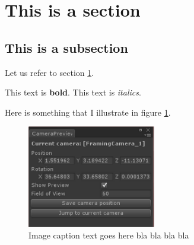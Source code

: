 \section{This is a section} \label{sec:thisSection}
\subsection{This is a subsection}
Let us refer to section \ref{sec:thisSection}.

This text is \textbf{bold}.
This text is \textit{italics}.


Here is something that I illustrate in figure \ref{fig:wavelength}.

\begin{figure}[htbp]
\centering
\includegraphics[width=0.50\textwidth]{Pics/Dummy}
\caption{Image caption text goes here bla bla bla bla}
\label{fig:wavelength}
\end{figure}

